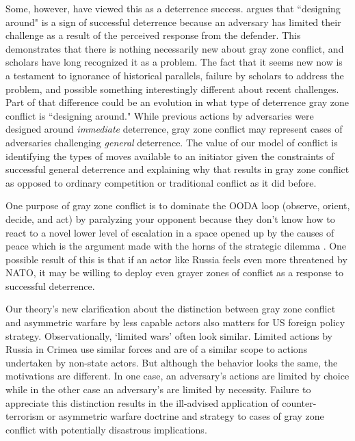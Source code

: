 \documentclass[12pt,letterpaper]{article}
\begin{document}
	Some, however, have viewed this as a deterrence success. \citet{lieberman_reconceptualizingdeterrencenudging_2012} argues that ``designing around" is a sign of successful deterrence because an adversary has limited their challenge as a result of the perceived response from the defender. This demonstrates that there is nothing necessarily new about gray zone conflict, and scholars have long recognized it as a problem. The fact that it seems new now is a testament to ignorance of historical parallels, failure by scholars to address the problem, and possible something interestingly different about recent challenges. Part of that difference could be an evolution in what type of deterrence gray zone conflict is ``designing around." While previous actions by adversaries were designed around \textit{immediate} deterrence, gray zone conflict may represent cases of adversaries challenging \textit{general} deterrence. The value of our model of conflict is identifying the types of moves available to an initiator given the constraints of successful general deterrence and explaining why that results in gray zone conflict as opposed to ordinary competition or traditional conflict as it did before.
		
	One purpose of gray zone conflict is to dominate the OODA loop (observe, orient, decide, and act) by paralyzing your opponent because they don't know how to react to a novel lower level of escalation in a space opened up by the causes of peace which is the argument made with the horns of the strategic dilemma \citep{maxwell_grayzonesubject_2016}. One possible result of this is that if an actor like Russia feels even more threatened by NATO, it may be willing to deploy even grayer zones of conflict as a response to successful deterrence.
		
	Our theory's new clarification about the distinction between gray zone conflict and asymmetric warfare by less capable actors also matters for US foreign policy strategy. Observationally, `limited wars' often look similar. Limited actions by Russia in Crimea use similar forces and are of a similar scope to actions undertaken by non-state actors. But although the behavior looks the same, the motivations are different. In one case, an adversary's actions are limited by choice while in the other case an adversary's are limited by necessity. Failure to appreciate this distinction results in the ill-advised application of counter-terrorism or asymmetric warfare doctrine and strategy to cases of gray zone conflict with potentially disastrous implications.
	
\end{document}
